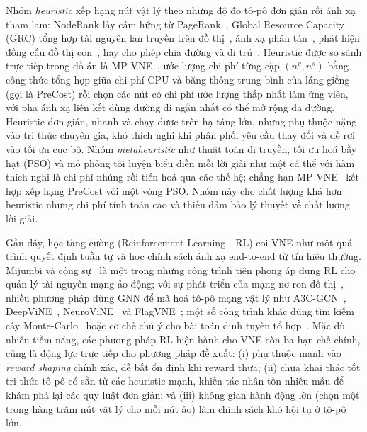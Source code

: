 \documentclass[../DoAn.tex]{subfiles}
\begin{document}
Nhóm \textit{heuristic} xếp hạng nút vật lý theo những độ đo tô-pô đơn giản rồi ánh xạ tham lam: NodeRank lấy cảm hứng từ PageRank~\cite{cheng2011vne_nr}, Global Resource Capacity (GRC) tổng hợp tài nguyên lan truyền trên đồ thị~\cite{gong2014grc}, ánh xạ phân tán~\cite{houidi2008distributed}, phát hiện đồng cấu đồ thị con~\cite{lischka2009virtual}, hay cho phép chia đường và di trú~\cite{yu2008rethinking}. Heuristic được so sánh trực tiếp trong đồ án là MP-VNE~\cite{mp_vne}, ước lượng chi phí từng cặp $(n^v, n^s)$ bằng công thức tổng hợp giữa chi phí CPU và băng thông trung bình của láng giềng (gọi là PreCost) rồi chọn các nút có chi phí ước lượng thấp nhất làm ứng viên, với pha ánh xạ liên kết dùng đường đi ngắn nhất có thể mở rộng đa đường. Heuristic đơn giản, nhanh và chạy được trên hạ tầng lớn, nhưng phụ thuộc nặng vào tri thức chuyên gia, khó thích nghi khi phân phối yêu cầu thay đổi và dễ rơi vào tối ưu cục bộ. Nhóm \textit{metaheuristic} như thuật toán di truyền, tối ưu hoá bầy hạt (PSO) và mô phỏng tôi luyện biểu diễn mỗi lời giải như một cá thể với hàm thích nghi là chi phí nhúng rồi tiến hoá qua các thế hệ; chẳng hạn MP-VNE~\cite{mp_vne} kết hợp xếp hạng PreCost với một vòng PSO. Nhóm này cho chất lượng khá hơn heuristic nhưng chi phí tính toán cao và thiếu đảm bảo lý thuyết về chất lượng lời giải.

Gần đây, học tăng cường (Reinforcement Learning - RL) coi VNE như một quá trình quyết định tuần tự và học chính sách ánh xạ end-to-end từ tín hiệu thưởng. Mijumbi và cộng sự~\cite{mijumbi2014rl} là một trong những công trình tiên phong áp dụng RL cho quản lý tài nguyên mạng ảo động; với sự phát triển của mạng nơ-ron đồ thị~\cite{kipf2017gcn, velickovic2018gat, wu2021gnn_survey}, nhiều phương pháp dùng GNN để mã hoá tô-pô mạng vật lý như A3C-GCN~\cite{yao2018a3c_gcn}, DeepViNE~\cite{dolati2019deepvine}, NeuroViNE~\cite{blenk2018neurovine} và FlagVNE~\cite{flagvne2024}; một số công trình khác dùng tìm kiếm cây Monte-Carlo~\cite{haeri2018mcts} hoặc cơ chế chú ý cho bài toán định tuyến tổ hợp~\cite{kool2019attention_co}. Mặc dù nhiều tiềm năng, các phương pháp RL hiện hành cho VNE còn ba hạn chế chính, cũng là động lực trực tiếp cho phương pháp đề xuất: (i) phụ thuộc mạnh vào \textit{reward shaping} chính xác, dễ bất ổn định khi reward thưa; (ii) chưa khai thác tốt tri thức tô-pô có sẵn từ các heuristic mạnh, khiến tác nhân tốn nhiều mẫu để khám phá lại các quy luật đơn giản; và (iii) không gian hành động lớn (chọn một trong hàng trăm nút vật lý cho mỗi nút ảo) làm chính sách khó hội tụ ở tô-pô lớn.
\end{document}
